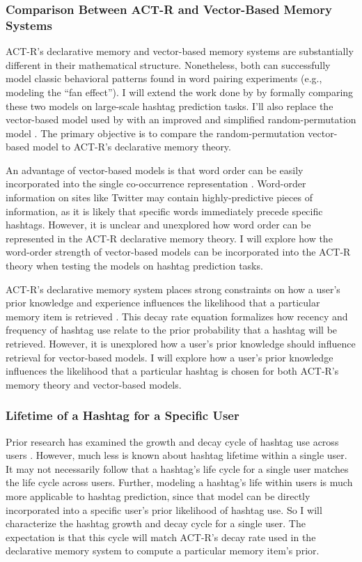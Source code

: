 \documentclass[man,floatsintext,donotrepeattitle]{apa6}
\begin{document}
\subsubsection{Comparison Between ACT-R and Vector-Based Memory Systems}

ACT-R's declarative memory and vector-based memory systems are substantially different in their mathematical structure.
Nonetheless, both can successfully model classic behavioral patterns found in word pairing experiments (e.g., \cite{Rutledge2008} modeling the ``fan effect'').
I will extend the work done by \citeauthor{Rutledge2008} by formally comparing these two models on large-scale hashtag prediction tasks.
I'll also replace the vector-based model used by \citeauthor{Rutledge2008} with an improved and simplified random-permutation model \parencite{Sahlgren2008}.
The primary objective is to compare the random-permutation vector-based model to ACT-R's declarative memory theory.

An advantage of vector-based models is that word order can be easily incorporated into the single co-occurrence representation \parencite{Jones2007}.
Word-order information on sites like Twitter may contain highly-predictive pieces of information, as it is likely that specific words immediately precede specific hashtags.
However, it is unclear and unexplored how word order can be represented in the ACT-R declarative memory theory.
I will explore how the word-order strength of vector-based models can be incorporated into the ACT-R theory when testing the models on hashtag prediction tasks.

ACT-R's declarative memory system places strong constraints on how a user's prior knowledge and experience influences the likelihood that a particular memory item is retrieved \parencite{Anderson2004}.
This decay rate equation formalizes how recency and frequency of hashtag use relate to the prior probability that a hashtag will be retrieved.
However, it is unexplored how a user's prior knowledge should influence retrieval for vector-based models.
I will explore how a user's prior knowledge influences the likelihood that a particular hashtag is chosen for both ACT-R's memory theory and vector-based models.

\subsubsection{Lifetime of a Hashtag for a Specific User}

Prior research has examined the growth and decay cycle of hashtag use across users \parencite{Tsur2012}.
However, much less is known about hashtag lifetime within a single user.
It may not necessarily follow that a hashtag's life cycle for a single user matches the life cycle across users.
Further, modeling a hashtag's life within users is much more applicable to hashtag prediction, since that model can be directly incorporated into a specific user's prior likelihood of hashtag use.
So I will characterize the hashtag growth and decay cycle for a single user.
The expectation is that this cycle will match ACT-R's decay rate used in the declarative memory system to compute a particular memory item's prior.
\end{document}
